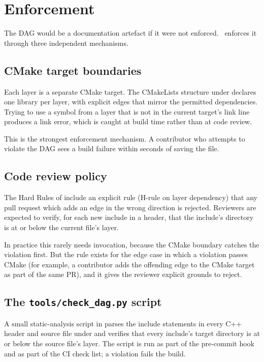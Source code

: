 \section{Enforcement}
\label{sec:layered_dag:enforcement}

The DAG would be a documentation artefact if it were not enforced.
\Lucid\ enforces it through three independent mechanisms.

\subsection{CMake target boundaries}
\label{ssec:layered_dag:cmake}

Each layer is a separate CMake target. The CMakeLists structure
under  declares one library per layer, with
explicit  edges that mirror the
permitted dependencies. Trying to use a symbol from a layer that
is not in the current target's link line produces a link error,
which is caught at build time rather than at code review.

This is the strongest enforcement mechanism. A contributor who
attempts to violate the DAG sees a build failure within seconds of
saving the file.

\subsection{Code review policy}
\label{ssec:layered_dag:review}

The Hard Rules of  include an explicit
rule (H-rule on layer dependency) that any pull request which
adds an edge in the wrong direction is rejected. Reviewers are
expected to verify, for each new include in a header, that the
include's directory is at or below the current file's layer.

In practice this rarely needs invocation, because the CMake
boundary catches the violation first. But the rule exists for the
edge case in which a violation passes CMake (for example, a
contributor adds the offending edge to the CMake target as part of
the same PR), and it gives the reviewer explicit grounds to
reject.

\subsection{The \texttt{tools/check\_dag.py} script}
\label{ssec:layered_dag:check_dag}

A small static-analysis script in 
parses the include statements in every C++ header and source file
under  and verifies that every include's target
directory is at or below the source file's layer. The script is
run as part of the pre-commit hook and as part of the CI check
list; a violation fails the build.

